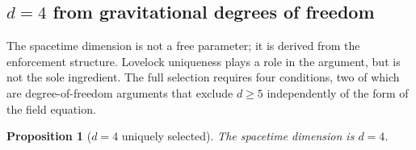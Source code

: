 \documentclass[11pt,a4paper]{article}
\newtheorem{proposition}[theorem]{Proposition}
\theoremstyle{definition}
\begin{document}
\subsection{$d = 4$ from gravitational degrees of freedom}
\label{sec:d4}

The spacetime dimension is not a free parameter; it is derived from the
enforcement structure.  Lovelock uniqueness plays a role in the argument,
but is not the sole ingredient.  The full selection requires four
conditions, two of which are degree-of-freedom arguments that exclude
$d \ge 5$ independently of the form of the field equation.

\begin{proposition}[$d = 4$ uniquely selected]\label{prop:d4}
The spacetime dimension is $d = 4$.
\end{proposition}
\end{document}
